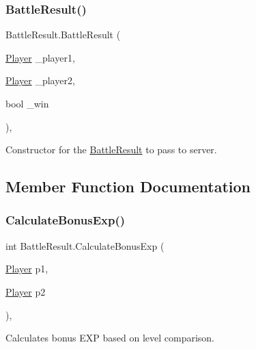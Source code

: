 \subsubsection{\texorpdfstring{BattleResult()}{BattleResult()}}
{\footnotesize\ttfamily Battle\+Result.\+Battle\+Result (\begin{DoxyParamCaption}\item[{\mbox{\hyperlink{class_player}{Player}}}]{\+\_\+player1,  }\item[{\mbox{\hyperlink{class_player}{Player}}}]{\+\_\+player2,  }\item[{bool}]{\+\_\+win }\end{DoxyParamCaption})\hspace{0.3cm}{\ttfamily [inline]}, {\ttfamily [private]}}



Constructor for the \mbox{\hyperlink{class_battle_result}{Battle\+Result}} to pass to server. 



\subsection{Member Function Documentation}
\mbox{\label{class_battle_result_af20191426878f7be611049a4715dcfbd}} 
\subsubsection{\texorpdfstring{CalculateBonusExp()}{CalculateBonusExp()}}
{\footnotesize\ttfamily int Battle\+Result.\+Calculate\+Bonus\+Exp (\begin{DoxyParamCaption}\item[{\mbox{\hyperlink{class_player}{Player}}}]{p1,  }\item[{\mbox{\hyperlink{class_player}{Player}}}]{p2 }\end{DoxyParamCaption})\hspace{0.3cm}{\ttfamily [inline]}, {\ttfamily [private]}}



Calculates bonus E\+XP based on level comparison. 

\mbox{\label{class_battle_result_ad5eed686021435525855eb55902be318}} 

